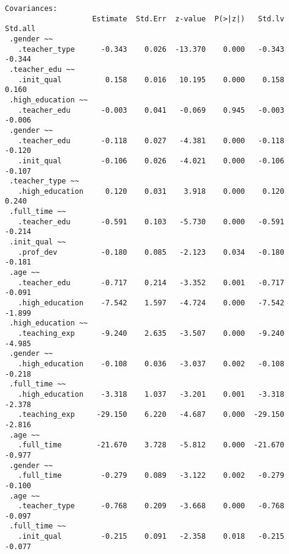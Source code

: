 \documentclass[
]{article}
\begin{document}
\begin{verbatim}
Covariances:
                    Estimate  Std.Err  z-value  P(>|z|)   Std.lv  Std.all
 .gender ~~                                                              
   .teacher_type      -0.343    0.026  -13.370    0.000   -0.343   -0.344
 .teacher_edu ~~                                                         
   .init_qual          0.158    0.016   10.195    0.000    0.158    0.160
 .high_education ~~                                                      
   .teacher_edu       -0.003    0.041   -0.069    0.945   -0.003   -0.006
 .gender ~~                                                              
   .teacher_edu       -0.118    0.027   -4.381    0.000   -0.118   -0.120
   .init_qual         -0.106    0.026   -4.021    0.000   -0.106   -0.107
 .teacher_type ~~                                                        
   .high_education     0.120    0.031    3.918    0.000    0.120    0.240
 .full_time ~~                                                           
   .teacher_edu       -0.591    0.103   -5.730    0.000   -0.591   -0.214
 .init_qual ~~                                                           
   .prof_dev          -0.180    0.085   -2.123    0.034   -0.180   -0.181
 .age ~~                                                                 
   .teacher_edu       -0.717    0.214   -3.352    0.001   -0.717   -0.091
   .high_education    -7.542    1.597   -4.724    0.000   -7.542   -1.899
 .high_education ~~                                                      
   .teaching_exp      -9.240    2.635   -3.507    0.000   -9.240   -4.985
 .gender ~~                                                              
   .high_education    -0.108    0.036   -3.037    0.002   -0.108   -0.218
 .full_time ~~                                                           
   .high_education    -3.318    1.037   -3.201    0.001   -3.318   -2.378
   .teaching_exp     -29.150    6.220   -4.687    0.000  -29.150   -2.816
 .age ~~                                                                 
   .full_time        -21.670    3.728   -5.812    0.000  -21.670   -0.977
 .gender ~~                                                              
   .full_time         -0.279    0.089   -3.122    0.002   -0.279   -0.100
 .age ~~                                                                 
   .teacher_type      -0.768    0.209   -3.668    0.000   -0.768   -0.097
 .full_time ~~                                                           
   .init_qual         -0.215    0.091   -2.358    0.018   -0.215   -0.077


\end{verbatim}
\end{document}
